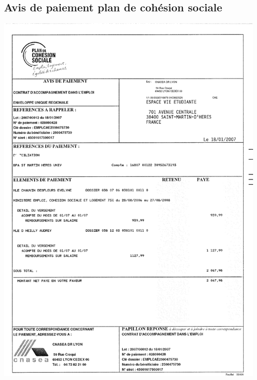 \subsection{Avis de paiement plan de cohésion sociale}
\begin{center}
\includegraphics[scale=0.7]{annexes/images/bonne_question.pdf}
\end{center}
